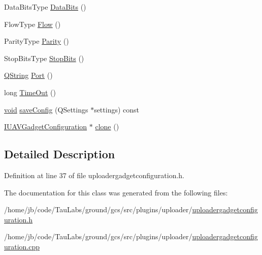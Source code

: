 \begin{DoxyCompactItemize}
\-Data\-Bits\-Type \hyperlink{group___y_modem_uploader_ga3bf92d26250fea27e32f58eaf761c9d7}{\-Data\-Bits} ()
\item 
\-Flow\-Type \hyperlink{group___y_modem_uploader_gac453b5e5875eeb4c1ded9a780608a188}{\-Flow} ()
\item 
\-Parity\-Type \hyperlink{group___y_modem_uploader_gabdb93d527f297834e083e424edf4843c}{\-Parity} ()
\item 
\-Stop\-Bits\-Type \hyperlink{group___y_modem_uploader_ga8f7d119b9f954ce05995540ca957568c}{\-Stop\-Bits} ()
\item 
\hyperlink{group___u_a_v_objects_plugin_gab9d252f49c333c94a72f97ce3105a32d}{\-Q\-String} \hyperlink{group___y_modem_uploader_gabf25c5e3dabcb3c129987a2d266b73dc}{\-Port} ()
\item 
long \hyperlink{group___y_modem_uploader_ga39f15ea85bd2c5de6f4a1a6d71f21032}{\-Time\-Out} ()
\item 
\hyperlink{group___u_a_v_objects_plugin_ga444cf2ff3f0ecbe028adce838d373f5c}{void} \hyperlink{group___y_modem_uploader_gade32c98be91417bbf87148f4629b5c18}{save\-Config} (\-Q\-Settings $\ast$settings) const 
\item 
\hyperlink{group___core_plugin_gacdfdf0b1e39b5002472b76b6564ce51f}{\-I\-U\-A\-V\-Gadget\-Configuration} $\ast$ \hyperlink{group___y_modem_uploader_gaf15392453c1ff2489f6e03d39d6338e8}{clone} ()
\end{DoxyCompactItemize}


\subsection{\-Detailed \-Description}


\-Definition at line 37 of file uploadergadgetconfiguration.\-h.



\-The documentation for this class was generated from the following files\-:\begin{DoxyCompactItemize}
\item 
/home/jb/code/\-Tau\-Labs/ground/gcs/src/plugins/uploader/\hyperlink{uploadergadgetconfiguration_8h}{uploadergadgetconfiguration.\-h}\item 
/home/jb/code/\-Tau\-Labs/ground/gcs/src/plugins/uploader/\hyperlink{uploadergadgetconfiguration_8cpp}{uploadergadgetconfiguration.\-cpp}\end{DoxyCompactItemize}
